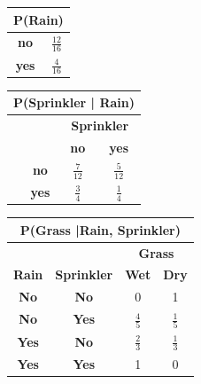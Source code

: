 \documentclass[10pt,a4paper]{article}
\newcommand{\p}{\textbf{P}}
\begin{document}
\begin{enumerate}
		\begingroup
			\renewcommand{\arraystretch}{1.5}
			\begin{table}[h!]
				\centering
				\begin{tabular}{|c|c|}
					\multicolumn{2}{c}{\textbf{\p(Rain)}} \\ \toprule
					\textbf{no} & $\frac{12}{16}$ \\
					\textbf{yes} & $\frac{4}{16}$ \\ \hline
				\end{tabular}
			\end{table}
		
			\begin{table}[h!]
				\centering
				\begin{tabular}{c|c|c|c|}
					\multicolumn{4}{c}{\textbf{\p(Sprinkler | Rain)}} \\ \toprule 
					\multicolumn{2}{c}{ } & \multicolumn{2}{c}{ \textbf{Sprinkler} } \\ \cline{3-4}
					\multicolumn{1}{c}{ \multirow{4}{*}{ \rotatebox{90}{\textbf{Rain}} }} & & \textbf{no} & \textbf{yes} \\ \cline{2-4}
					& \textbf{no} & $\frac{7}{12}$ & $\frac{5}{12}$ \\
					& \textbf{yes} & $\frac{3}{4}$ & $\frac{1}{4}$ \\ \cline{2-4}
				\end{tabular}
			\end{table}
		
			\begin{table}[h!]
				\centering
				\begin{tabular}{|c|c|c|c|}
					\multicolumn{4}{c}{\textbf{\p(Grass |Rain, Sprinkler)}} \\ \toprule 
					\multicolumn{2}{c}{ } & \multicolumn{2}{c}{ \textbf{Grass} } \\ \hline
					\textbf{Rain} & \textbf{Sprinkler} & \textbf{Wet} & \textbf{Dry} \\ \hline
					\textbf{No} & \textbf{No} & 0 & 1 \\
					\textbf{No} & \textbf{Yes} & $\frac{4}{5}$ & $\frac{1}{5}$ \\
					\textbf{Yes} & \textbf{No} & $\frac{2}{3}$ & $\frac{1}{3}$ \\
					\textbf{Yes} & \textbf{Yes} & 1 & 0 \\ \hline
				\end{tabular}
			\end{table}
		
		\endgroup
		

\end{enumerate}
\end{document}
